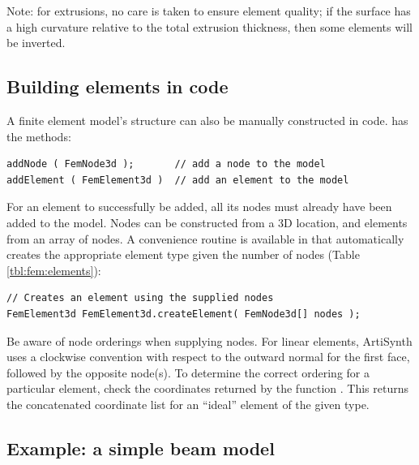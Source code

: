 \begin{sideblock}
Note: for extrusions, no care is taken to ensure element quality; if the 
surface has a high curvature relative to the total extrusion thickness, 
then some elements will be inverted.
\end{sideblock}

\subsection{Building elements in code}

A finite element model's structure can also be manually constructed in code.  
 has the methods:
\begin{lstlisting}[]
addNode ( FemNode3d );       // add a node to the model
addElement ( FemElement3d )  // add an element to the model
\end{lstlisting}
For an element to successfully be added, all its nodes must already have
been added to the model.  Nodes can be constructed from a 3D location, and
elements from an array of nodes.  A convenience routine is available in
 that automatically creates
the appropriate element type given the number of nodes (Table 
\ref{tbl:fem:elements}):
\begin{lstlisting}[]
// Creates an element using the supplied nodes
FemElement3d FemElement3d.createElement( FemNode3d[] nodes );
\end{lstlisting}
Be aware of node orderings when supplying nodes.  For linear elements, 
ArtiSynth uses a clockwise convention with respect to the outward
normal for the first face, followed by the opposite node(s).  To determine the
correct ordering for a particular element, check the coordinates returned by 
the function 
.
This returns the concatenated coordinate list for an ``ideal'' element of
the given type.

\subsection{Example: a simple beam model}
\label{sec:fem:example:fembeam}

